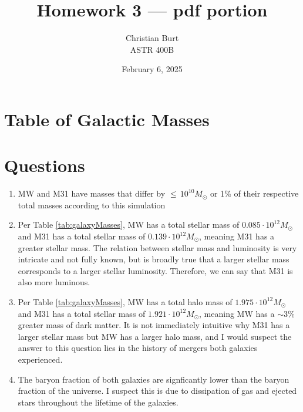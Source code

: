 \documentclass{article}
\title{Homework 3 — pdf portion}
\author{Christian Burt\\ASTR 400B}
\date{February 6, 2025}
\begin{document}
\maketitle
\setcounter{section}{2} %
    
    \section{Table of Galactic Masses}
    
    
    
    \section{Questions}

    \begin{enumerate}
        \item MW and M31 have masses that differ by $\le \, 10^{10} M_\odot$
          or 1\% of their respective total masses according to this simulation
          
        \item Per Table \ref{tab:galaxyMasses}, MW has a total stellar mass of
          $0.085 \cdot 10^{12} M_\odot$ and M31 has a total stellar mass of
          $0.139 \cdot 10^{12} M_\odot$, meaning M31 has a greater stellar
          mass. The relation between stellar mass and luminosity is very
          intricate and not fully known, but is broadly true that a larger
          stellar mass corresponds to a larger stellar luminosity. Therefore,
          we can say that M31 is also more luminous.

        \item Per Table \ref{tab:galaxyMasses}, MW has a total halo mass of
          $1.975 \cdot 10^{12} M_\odot$ and M31 has a total stellar mass of
          $1.921 \cdot 10^{12} M_\odot$, meaning MW has a $\sim3\%$ greater
          mass of dark matter. It is not immediately intuitive why M31 has a
          larger stellar mass but MW has a larger halo mass, and I would
          suspect the answer to this question lies in the history of mergers
          both galaxies experienced.

        \item The baryon fraction of both galaxies are signficantly lower than
          the baryon fraction of the universe. I suspect this is due to
          dissipation of gas and ejected stars throughout the lifetime of the
          galaxies.
    \end{enumerate}
    

% 
% 
\end{document}
